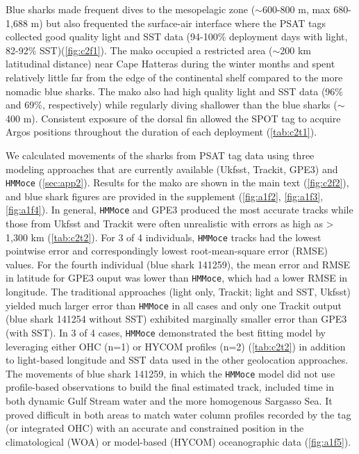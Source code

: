 Blue sharks made frequent dives to the mesopelagic zone
($\sim$600-800 m, max 680-1,688 m) but also frequented the
surface-air interface where the PSAT tags collected good quality light
and SST data (94-100\% deployment days with light, 82-92\% SST)(\cref{fig:c2f1}). The mako occupied a restricted area
($\sim$200 km latitudinal distance) near Cape Hatteras during
the winter months and spent relatively little far from the edge of the
continental shelf compared to the more nomadic blue sharks. The mako
also had high quality light and SST data (96\% and 69\%, respectively)
while regularly diving shallower than the blue sharks
($\sim$400 m). Consistent exposure of the dorsal fin allowed
the SPOT tag to acquire Argos positions throughout the duration of each
deployment (\cref{tab:c2t1}).

We calculated movements of the sharks from PSAT tag data using three
modeling approaches that are currently available (Ukfsst, Trackit, GPE3)
and \texttt{HMMoce} (\cref{sec:app2}). Results for the mako are shown in the
main text (\cref{fig:c2f2}), and blue shark figures are
provided in the supplement (\cref{fig:a1f2}, \cref{fig:a1f3}, \cref{fig:a1f4}). In general,
\texttt{HMMoce} and GPE3 produced the most accurate tracks while those
from Ukfsst and Trackit were often unrealistic with errors as high as
> 1,300 km (\cref{tab:c2t2}). For 3 of 4 individuals, \texttt{HMMoce}
tracks had the lowest pointwise error and correspondingly lowest
root-mean-square error (RMSE) values. For the fourth individual (blue
shark 141259), the mean error and RMSE in latitude for GPE3 ouput was
lower than \texttt{HMMoce}, which had a lower RMSE in longitude. The
traditional approaches (light only, Trackit; light and SST, Ukfsst)
yielded much larger error than \texttt{HMMoce} in all cases and only one
Trackit output (blue shark 141254 without SST) exhibited marginally
smaller error than GPE3 (with SST). In 3 of 4 cases, \texttt{HMMoce}
demonstrated the best fitting model by leveraging either OHC (n=1) or
HYCOM profiles (n=2) (\cref{tab:c2t2}) in addition to light-based longitude and
SST data used in the other geolocation approaches. The movements of blue
shark 141259, in which the \texttt{HMMoce} model did not use
profile-based observations to build the final estimated track, included
time in both dynamic Gulf Stream water and the more homogenous Sargasso
Sea. It proved difficult in both areas to match water column profiles
recorded by the tag (or integrated OHC) with an accurate and constrained
position in the climatological (WOA) or model-based (HYCOM)
oceanographic data (\cref{fig:a1f5}).


